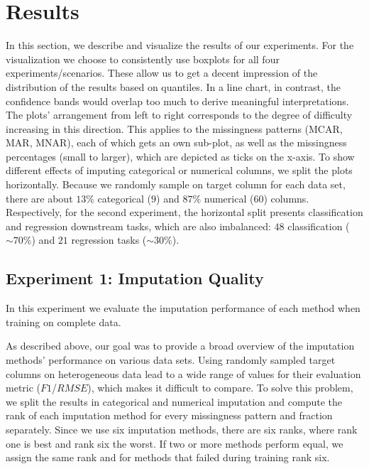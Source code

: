 \section{Results}
\label{sec:results}

In this section, we describe and visualize the results of our experiments. For the visualization we choose to consistently use boxplots for all four experiments/scenarios. These allow us to get a decent impression of the distribution of the results based on quantiles. In a line chart, in contrast, the confidence bands would overlap too much to derive meaningful interpretations. The plots' arrangement from left to right corresponds to the degree of difficulty increasing in this direction. This applies to the missingness patterns (MCAR, MAR, MNAR), each of which gets an own sub-plot, as well as the missingness percentages (small to larger), which are depicted as ticks on the x-axis. To show different effects of imputing categorical or numerical columns, we split the plots horizontally. Because we randomly sample on target column for each data set, there are about $13\%$ categorical ($9$) and $87\%$ numerical ($60$) columns. Respectively, for the second experiment, the horizontal split presents classification and regression downstream tasks, which are also imbalanced: $48$ classification ($\sim70\%$) and $21$ regression tasks ($\sim30\%$).



\subsection{Experiment 1: Imputation Quality}

In this experiment we evaluate the imputation performance of each method when training on complete data.

As described above, our goal was to provide a broad overview of the imputation methods' performance on various data sets. Using randomly sampled target columns on heterogeneous data lead to a wide range of values for their evaluation metric ($F1$/$RMSE$), which makes it difficult to compare. To solve this problem, we split the results in categorical and numerical imputation and compute the rank of each imputation method for every missingness pattern and fraction separately. Since we use six imputation methods, there are six ranks, where rank one is best and rank six the worst. If two or more methods perform equal, we assign the same rank and for methods that failed during training rank six.


